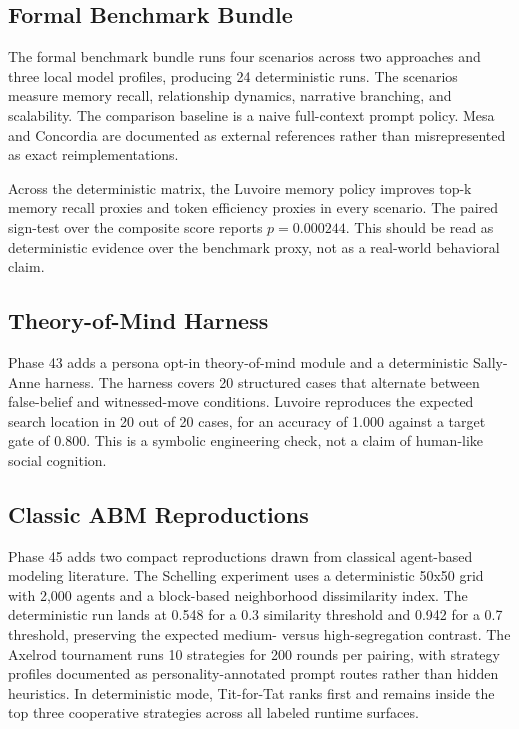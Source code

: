 \subsection{Formal Benchmark Bundle}

The formal benchmark bundle runs four scenarios across two approaches and three local model profiles, producing 24 deterministic runs. The scenarios measure memory recall, relationship dynamics, narrative branching, and scalability. The comparison baseline is a naive full-context prompt policy. Mesa and Concordia are documented as external references rather than misrepresented as exact reimplementations.




Across the deterministic matrix, the Luvoire memory policy improves top-k memory recall proxies and token efficiency proxies in every scenario. The paired sign-test over the composite score reports $p=0.000244$. This should be read as deterministic evidence over the benchmark proxy, not as a real-world behavioral claim.



\subsection{Theory-of-Mind Harness}

Phase 43 adds a persona opt-in theory-of-mind module and a deterministic Sally-Anne harness. The harness covers 20 structured cases that alternate between false-belief and witnessed-move conditions. Luvoire reproduces the expected search location in 20 out of 20 cases, for an accuracy of 1.000 against a target gate of 0.800. This is a symbolic engineering check, not a claim of human-like social cognition.



\subsection{Classic ABM Reproductions}

Phase 45 adds two compact reproductions drawn from classical agent-based modeling literature. The Schelling experiment uses a deterministic 50x50 grid with 2,000 agents and a block-based neighborhood dissimilarity index. The deterministic run lands at 0.548 for a 0.3 similarity threshold and 0.942 for a 0.7 threshold, preserving the expected medium- versus high-segregation contrast. The Axelrod tournament runs 10 strategies for 200 rounds per pairing, with strategy profiles documented as personality-annotated prompt routes rather than hidden heuristics. In deterministic mode, Tit-for-Tat ranks first and remains inside the top three cooperative strategies across all labeled runtime surfaces.

